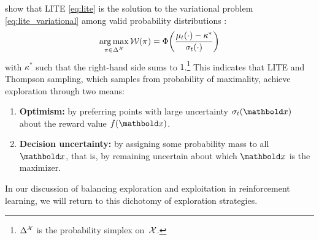 \cite{menet2025lite} show that LITE \eqref{eq:lite} is the solution to the variational problem \eqref{eq:lite_variational} among valid probability distributions : \begin{align}
  \argmax_{\pi \in \Delta^{\spX}} \spW(\pi) = \Phi\parentheses*{\frac{\mu_t(\cdot) - \kappa^*}{\sigma_t(\cdot)}} \label{eq:lite_variational_solution}
\end{align} with $\kappa^*$ such that the right-hand side sums to $1$.\footnote{$\Delta^{\mathcal{X}}$ is the probability simplex on~$\mathcal{X}$.}
This indicates that LITE and Thompson sampling, which samples from probability of maximality, achieve exploration through two means: \begin{enumerate}
  \item \textbf{Optimism:} by preferring points with large uncertainty $\sigma_t(\vx)$ about the reward value $f(\vx)$.
  \item \textbf{Decision uncertainty:} by assigning some probability mass to all $\vx$, that is, by remaining uncertain about which $\vx$ is the maximizer.
\end{enumerate}
In our discussion of balancing exploration and exploitation in reinforcement learning, we will return to this dichotomy of exploration strategies.

